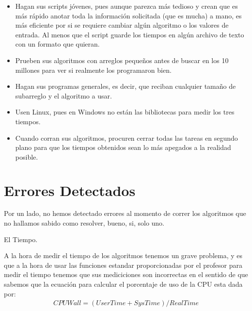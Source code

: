 \documentclass[12pt, fleqn]{article}                             %
\theoremstyle{break}                                            %
\begin{document}
\begin{itemize}
                \begin{itemize}\setlength\itemsep{0em}
                    \item Hagan sus scripts jóvenes, pues aunque parezca más tedioso y crean que es más rápido
                        anotar toda la información solicitada (que es mucha) a mano, es más eficiente por si se
                        requiere cambiar algún algoritmo o los valores de entrada. Al menos que el script guarde
                        los tiempos en algún archivo de texto con un formato que quieran.
                    \item Prueben sus algoritmos con arreglos pequeños antes de buscar en los 10 millones para ver
                        si realmente los programaron bien.
                    \item Hagan sus programas generales, es decir, que reciban cualquier tamaño de subarreglo y
                        el algoritmo a usar.
                    \item Usen Linux, pues en Windows no están las bibliotecas para medir los tres tiempos.
                    \item Cuando corran sus algoritmos, procuren cerrar todas las tareas en segundo plano para
                        que los tiempos obtenidos sean lo más apegados a la realidad posible.
                \end{itemize}

        \end{itemize}




\clearpage
\section{Errores Detectados}

    Por un lado, no hemos detectado errores al momento de correr los algoritmos
    que no hallamos sabido como resolver, bueno, si, solo uno.

    El Tiempo.

    A la hora de medir el tiempo de los algoritmos tenemos un grave problema,
    y es que a la hora de usar las funciones estandar proporcionadas por el profesor
    para medir el tiempo tenemos que sus mediciciones son incorrectas en el sentido
    de que sabemos que la ecuación para calcular el porcentaje de uso de la CPU 
    esta dada por:
    \begin{align*}
        CPUWall = (UserTime + SysTime) / RealTime
    \end{align*}
\end{document}
